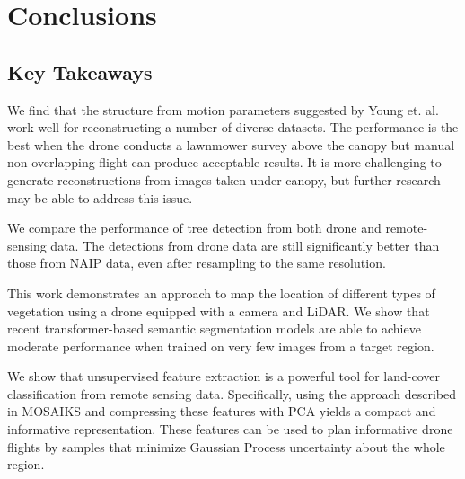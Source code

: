 
\chapter{Conclusions} \label{chapConclusions}
\section{Key Takeaways}
We find that the structure from motion parameters suggested by Young et. al. \cite{Young2022} work well for reconstructing a number of diverse datasets. The performance is the best when the drone conducts a lawnmower survey above the canopy but manual non-overlapping flight can produce acceptable results. It is more challenging to generate reconstructions from images taken under canopy, but further research may be able to address this issue.

We compare the performance of tree detection from both drone and remote-sensing data. The detections from drone data are still significantly better than those from NAIP data, even after resampling to the same resolution. 

This work demonstrates an approach to map the location of different types of vegetation using a drone equipped with a camera and LiDAR. We show that recent transformer-based semantic segmentation models are able to achieve moderate performance when trained on very few images from a target region.

We show that unsupervised feature extraction is a powerful tool for land-cover classification from remote sensing data. Specifically, using the approach described in MOSAIKS and compressing these features with PCA yields a compact and informative representation. These features can be used to plan informative drone flights by samples that minimize Gaussian Process uncertainty about the whole region.  


